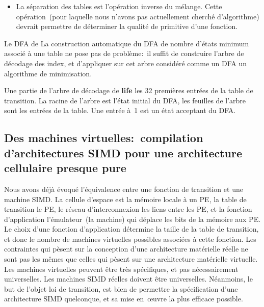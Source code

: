 \begin{itemize}
{    récupération~(trap) des défauts de pages.}, %
  que par le système d'exploitation. %
  La dualité opposant l'usage de nombreuses petites tables appliquées
  en parallèle sur un même espace, à l'usage d'une seule grande ou
  très grande table, permet de choisir entre une mise en~œuvre
  adaptée au développement incrémental interactif~(faible délai de
  mise en marche d'une architecture, associé à un débit de mise à jour
  cellulaire non optimum), et une mise en~œuvre adaptée à
  l'exploration de la dynamique à long terme d'AC sur de grands
  espaces~(temps de démarrage important, associé à un débit de mise à
  jour cellulaire optimum pour une architecture matérielle donnée). %

\item%
  La séparation des tables est l'opération inverse du mélange. %
  Cette opération~(pour laquelle nous n'avons pas actuellement cherché
  d'algorithme) devrait permettre de déterminer la qualité de
  primitive d'une fonction. %
\end{itemize}

%
{}%
{Le DFA de }%
{La construction automatique du DFA de nombre d'états minimum associé
  à une table ne pose pas de problème:~il suffit de construire l'arbre
  de décodage des index, et d'appliquer sur cet arbre considéré
  comme un DFA un algorithme de minimisation.}

%
{}%
{Une partie de l'arbre de décodage de \textbf{life}}%
{les 32 premières entrées de la table de transition. %
  La racine de l'arbre est l'état initial du DFA, les feuilles de
  l'arbre sont les entrées de la table. %
  Une entrée à~1 est un état acceptant du DFA\@.}

\subsection{Des machines virtuelles:~compilation d'architec\-tures SIMD
  pour une architec\-ture cellulaire presque pure}

Nous avons déjà évoqué l'équivalence entre une fonction de transition
et une machine SIMD\@. %
La cellule d'espace est la mémoire locale à un PE, la table de
transition le PE, le réseau d'interconnexion les liens entre les PE,
et la fonction d'application l'émulateur~(la machine) qui
déplace les bits de la mémoire aux PE\@. %
Le choix d'une fonction d'application détermine la taille de la table
de transition, et donc le nombre de machines virtuelles possibles
associées à cette fonction. %
Les contraintes qui pèsent sur la conception d'une architecture
matérielle réelle ne sont pas les mêmes que celles qui pèsent
sur une architecture matérielle virtuelle. %
Les machines virtuelles peuvent être très spécifiques,
et pas nécessairement universelles. %
Les machines SIMD réelles doivent être universelles. %
Néanmoins, le but de l'objet loi de transition, est bien de permettre
la spécification d'une architecture SIMD quelconque, et sa mise
en~œuvre la plus efficace possible. %

